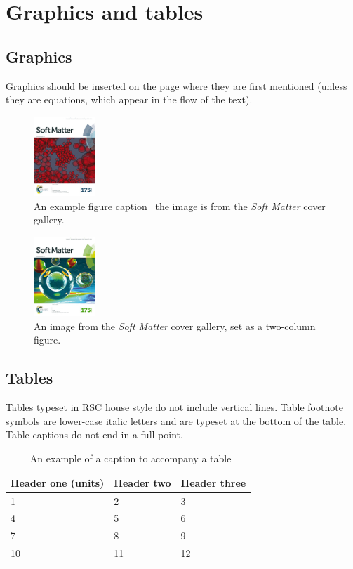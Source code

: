 \documentclass[twoside,twocolumn,9pt]{article}
\begin{document}
\section{Graphics and tables}
\subsection{Graphics}
Graphics should be inserted on the page where they are first mentioned (unless they are equations, which appear in the flow of the text).\cite{Cotton1999}

\begin{figure}[h]
\centering
  \includegraphics[height=3cm]{example1}
  \caption{An example figure caption \textendash\ the image is from the \textit{Soft Matter} cover gallery.}
  \label{fgr:example}
\end{figure}

\begin{figure}
 \centering
 \includegraphics[height=3cm]{example2}
 \caption{An image from the \textit{Soft Matter} cover gallery, set as a two-column figure.}
 \label{fgr:example2col}
\end{figure}

\subsection{Tables}
Tables typeset in RSC house style do not include vertical lines. Table footnote symbols are lower-case italic letters and are typeset at the bottom of the table. Table captions do not end in a full point.\cite{Arduengo1992,Eisenstein2005}


\begin{table}[h]
\small
  \caption{\ An example of a caption to accompany a table}
  \label{tbl:example}
  \begin{tabular*}{0.48\textwidth}{@{\extracolsep{\fill}}lll}
    \hline
    Header one (units) & Header two & Header three \\
    \hline
    1 & 2 & 3 \\
    4 & 5 & 6 \\
    7 & 8 & 9 \\
    10 & 11 & 12 \\
    \hline
  \end{tabular*}
\end{table}
\end{document}
